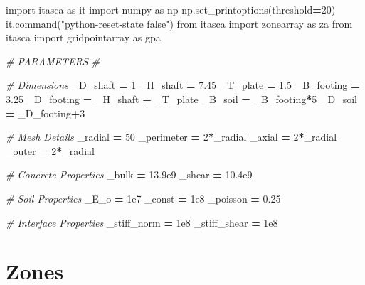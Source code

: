 \documentclass[a4paper, nobind]{templates/ociamthesis}
\newenvironment{Shaded}{\begin{snugshade}}{\end{snugshade}}
\newcommand{\CommentTok}[1]{\textcolor[rgb]{0.56,0.35,0.01}{\textit{#1}}}
\newcommand{\DecValTok}[1]{\textcolor[rgb]{0.00,0.00,0.81}{#1}}
\newcommand{\FloatTok}[1]{\textcolor[rgb]{0.00,0.00,0.81}{#1}}
\newcommand{\ImportTok}[1]{#1}
\newcommand{\NormalTok}[1]{#1}
\newcommand{\OperatorTok}[1]{\textcolor[rgb]{0.81,0.36,0.00}{\textbf{#1}}}
\newcommand{\StringTok}[1]{\textcolor[rgb]{0.31,0.60,0.02}{#1}}
\renewenvironment{Shaded}
{
  \vspace{10pt}%
  \begin{snugshade}%
}{%
  \end{snugshade}%
  \vspace{8pt}%
}
\begin{document}
\begin{Shaded}
\begin{Highlighting}[]
\ImportTok{import}\NormalTok{ itasca }\ImportTok{as}\NormalTok{ it}
\ImportTok{import}\NormalTok{ numpy }\ImportTok{as}\NormalTok{ np}
\NormalTok{np.set\_printoptions(threshold}\OperatorTok{=}\DecValTok{20}\NormalTok{)}
\NormalTok{it.command(}\StringTok{"python{-}reset{-}state false"}\NormalTok{)}
\ImportTok{from}\NormalTok{ itasca }\ImportTok{import}\NormalTok{ zonearray }\ImportTok{as}\NormalTok{ za}
\ImportTok{from}\NormalTok{ itasca }\ImportTok{import}\NormalTok{ gridpointarray }\ImportTok{as}\NormalTok{ gpa}

\CommentTok{\# PARAMETERS \#}

\CommentTok{\# Dimensions}
\NormalTok{\_D\_shaft }\OperatorTok{=} \DecValTok{1}
\NormalTok{\_H\_shaft }\OperatorTok{=} \FloatTok{7.45}
\NormalTok{\_T\_plate }\OperatorTok{=} \FloatTok{1.5}
\NormalTok{\_B\_footing }\OperatorTok{=} \FloatTok{3.25}
\NormalTok{\_D\_footing }\OperatorTok{=}\NormalTok{ \_H\_shaft }\OperatorTok{+}\NormalTok{ \_T\_plate}
\NormalTok{\_B\_soil }\OperatorTok{=}\NormalTok{ \_B\_footing}\OperatorTok{*}\DecValTok{5}
\NormalTok{\_D\_soil }\OperatorTok{=}\NormalTok{ \_D\_footing}\OperatorTok{+}\DecValTok{3}

\CommentTok{\# Mesh Details}
\NormalTok{\_radial }\OperatorTok{=} \DecValTok{50}
\NormalTok{\_perimeter }\OperatorTok{=} \DecValTok{2}\OperatorTok{*}\NormalTok{\_radial}
\NormalTok{\_axial }\OperatorTok{=} \DecValTok{2}\OperatorTok{*}\NormalTok{\_radial}
\NormalTok{\_outer }\OperatorTok{=} \DecValTok{2}\OperatorTok{*}\NormalTok{\_radial}

\CommentTok{\# Concrete Properties}
\NormalTok{\_bulk }\OperatorTok{=} \FloatTok{13.9e9}
\NormalTok{\_shear }\OperatorTok{=} \FloatTok{10.4e9}

\CommentTok{\# Soil Properties}
\NormalTok{\_E\_o }\OperatorTok{=} \FloatTok{1e7}
\NormalTok{\_const }\OperatorTok{=} \FloatTok{1e8}
\NormalTok{\_poisson }\OperatorTok{=} \FloatTok{0.25}

\CommentTok{\# Interface Properties}
\NormalTok{\_stiff\_norm }\OperatorTok{=} \FloatTok{1e8}
\NormalTok{\_stiff\_shear }\OperatorTok{=} \FloatTok{1e8}
\end{Highlighting}
\end{Shaded}

\hypertarget{zones}{%
\section{Zones}\label{zones}}
\end{document}
